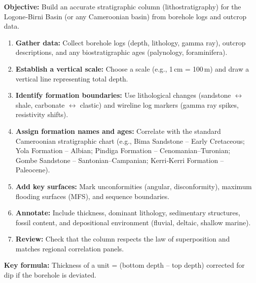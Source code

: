 \documentclass[11pt]{article}
\newcommand{\cle}[1]{{\popxbold\color{popdark}#1}}
\begin{document}
\begin{methode}
\textbf{Objective:} Build an accurate stratigraphic column (lithostratigraphy) for the \cle{Logone‑Birni Basin} (or any Cameroonian basin) from borehole logs and outcrop data.
\begin{enumerate}
\item \textbf{Gather data:} Collect borehole logs (depth, lithology, gamma ray), outcrop descriptions, and any biostratigraphic ages (palynology, foraminifera).
\item \textbf{Establish a vertical scale:} Choose a scale (e.g., 1\,cm = 100\,m) and draw a vertical line representing total depth.
\item \textbf{Identify formation boundaries:} Use lithological changes (sandstone $\leftrightarrow$ shale, carbonate $\leftrightarrow$ clastic) and wireline log markers (gamma ray spikes, resistivity shifts).
\item \textbf{Assign formation names and ages:} Correlate with the standard Cameroonian stratigraphic chart (e.g., \cle{Bima Sandstone} – Early Cretaceous; \cle{Yola Formation} – Albian; \cle{Pindiga Formation} – Cenomanian–Turonian; \cle{Gombe Sandstone} – Santonian–Campanian; \cle{Kerri‑Kerri Formation} – Paleocene).
\item \textbf{Add key surfaces:} Mark unconformities (angular, disconformity), maximum flooding surfaces (MFS), and sequence boundaries.
\item \textbf{Annotate:} Include thickness, dominant lithology, sedimentary structures, fossil content, and depositional environment (fluvial, deltaic, shallow marine).
\item \textbf{Review:} Check that the column respects the law of superposition and matches regional correlation panels.
\end{enumerate}
\textbf{Key formula:} Thickness of a unit = (bottom depth – top depth) corrected for dip if the borehole is deviated.
\end{methode}
\end{document}
